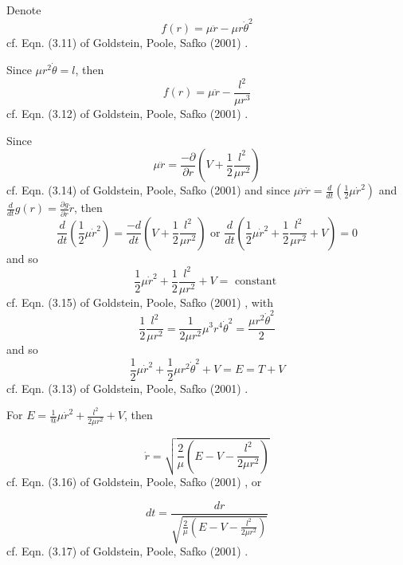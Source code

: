 Denote 
\begin{equation}
f(r) = \mu \ddot{r} - \mu r\dot{\theta}^2
\end{equation}
cf. Eqn. (3.11) of  Goldstein, Poole, Safko (2001) \cite{dgdt:GPS2001}.

Since $\mu r^2 \dot{\theta} = l$, then
\begin{equation}
f(r) = \mu \ddot{r} - \frac{l^2}{\mu r^3}
\end{equation}
cf. Eqn. (3.12) of Goldstein, Poole, Safko (2001) \cite{dgdt:GPS2001}.

Since 
\begin{equation}
\mu \ddot{r} = \frac{- \partial}{\partial r} \left( V + \frac{1}{2} \frac{l^2 }{\mu r^2} \right)
\end{equation}
cf. Eqn. (3.14) of Goldstein, Poole, Safko (2001) \cite{dgdt:GPS2001} and since $\mu \ddot{r} \dot{r} = \frac{d}{dt} \left( \frac{1}{2} \mu \dot{r}^2 \right)$ and $\frac{d}{dt} g(r) = \frac{\partial g}{\partial r} \dot{r}$, then
\[
\frac{d}{dt} \left( \frac{1}{2} \mu \dot{r}^2 \right) = \frac{-d}{dt} \left( V + \frac{1}{2} \frac{l^2 }{ \mu r^2 } \right) \text{ or } \frac{d}{dt} \left( \frac{1}{2} \mu \dot{r}^2 + \frac{1}{2} \frac{l^2}{ \mu r^2 } + V \right) = 0
\]
and so
\begin{equation}
\frac{1}{2} \mu \dot{r}^2 + \frac{1}{2} \frac{l^2}{ \mu r^2} + V = \text{ constant } 
\end{equation}
cf. Eqn. (3.15) of  Goldstein, Poole, Safko (2001) \cite{dgdt:GPS2001}, with
\[
\frac{1}{2} \frac{l^2 }{\mu r^2 } = \frac{1}{2 \mu r^2} \mu^3 r^4 \dot{\theta}^2 = \frac{\mu r^2 \dot{\theta}^2 }{2} 
\]
and so
\begin{equation}
\frac{1}{2} \mu \dot{r}^2 + \frac{1}{2} \mu r^2 \dot{\theta}^2 + V = E = T+V 
\end{equation}
cf. Eqn. (3.13) of  Goldstein, Poole, Safko (2001) \cite{dgdt:GPS2001}.

For $E = \frac{1}{@} \mu \dot{r}^2 + \frac{l^2}{2\mu r^2 } + V$, then 

\begin{equation}
\dot{r} = \sqrt{ \frac{2}{\mu} \left( E - V - \frac{l^2}{2 \mu r^2}  \right)  }
\end{equation}
cf. Eqn. (3.16)  of Goldstein, Poole, Safko (2001) \cite{dgdt:GPS2001}, or 

\begin{equation}
dt =\frac{dr}{ \sqrt{ \frac{2}{\mu} \left( E - V - \frac{l^2}{2 \mu r^2 } \right) } }
\end{equation}
cf. Eqn. (3.17) of  Goldstein, Poole, Safko (2001) \cite{dgdt:GPS2001}.

